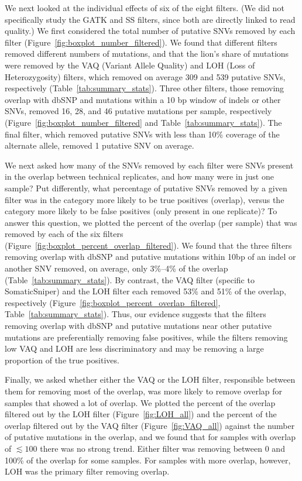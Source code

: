 \documentclass[11 pt]{article} %
\begin{document}
We next looked at the individual effects of six of the eight filters. (We did not specifically study the GATK and SS filters, since both are directly linked to read quality.) We first considered the total number of putative SNVs removed by each filter (Figure~\ref{fig:boxplot_number_filtered}). We found that different filters removed different numbers of mutations, and that the lion's share of mutations were removed by the VAQ (Variant Allele Quality) and LOH (Loss of Heterozygosity) filters, which removed on average 309 and 539 putative SNVs, respectively (Table~\ref{tab:summary_stats}). Three other filters, those removing overlap with dbSNP and mutations within a 10 bp window of indels or other SNVs, removed 16, 28, and 46 putative mutations per sample, respectively (Figure~\ref{fig:boxplot_number_filtered} and Table~\ref{tab:summary_stats}). The final filter, which removed putative SNVs with less than 10\% coverage of the alternate allele, removed 1 putative SNV on average. 

We next asked how many of the SNVs removed by each filter were SNVs present in the overlap between technical replicates, and how many were in just one sample? Put differently, what percentage of putative SNVs removed by a given filter was in the category more likely to be true positives (overlap), versus the category more likely to be false positives (only present in one replicate)? To answer this question, we plotted the percent of the overlap (per sample) that was removed by each of the six filters (Figure~\ref{fig:boxplot_percent_overlap_filtered}). We found that the three filters removing overlap with dbSNP and putative mutations within 10bp of an indel or another SNV removed, on average, only 3\%--4\% of the overlap (Table~\ref{tab:summary_stats}). By contrast, the VAQ filter (specific to SomaticSniper) and the LOH filter each removed 53\% and 51\% of the overlap, respectively (Figure~\ref{fig:boxplot_percent_overlap_filtered}, Table~\ref{tab:summary_stats}). Thus, our evidence suggests that the filters removing overlap with dbSNP and putative mutations near other putative mutations are preferentially removing false positives, while the filters removing low VAQ and LOH are less discriminatory and may be removing a large proportion of the true positives. 

Finally, we asked whether either the VAQ or the LOH filter, responsible between them for removing most of the overlap, was more likely to remove overlap for samples that showed a lot of overlap. We plotted the percent of the overlap filtered out by the LOH filter (Figure~\ref{fig:LOH_all}) and the percent of the overlap filtered out by the VAQ filter (Figure~\ref{fig:VAQ_all}) against the number of putative mutations in the overlap, and we found that for samples with overlap of $\lesssim 100$ there was no strong trend. Either filter was removing between 0 and 100\% of the overlap for some samples. For samples with more overlap, however, LOH was the primary filter removing overlap.   
\end{document}
